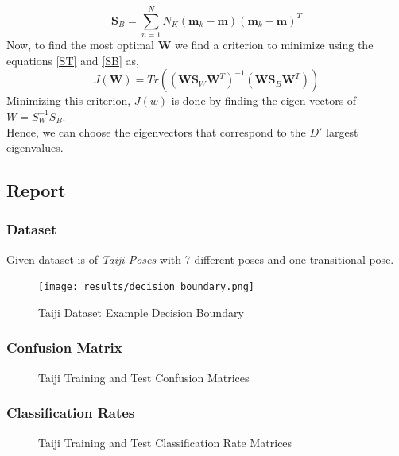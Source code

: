 \documentclass[12pt,twoside,a4paper]{article}
\begin{document}
\begin{equation} \label{SB}
    \textbf{S}_B = \sum_{n=1}^N N_K(\textbf{m}_k - \textbf{m})(\textbf{m}_k - \textbf{m})^T
\end{equation}
Now, to find the most optimal \textbf{W} we find a criterion to minimize using the equations \eqref{ST} and \eqref{SB} as,
\begin{equation}
    J(\textbf{W}) = Tr\left( (\textbf{W}\textbf{S}_W\textbf{W}^T)^{-1} (\textbf{W}\textbf{S}_B\textbf{W}^T) \right )
\end{equation}
Minimizing this criterion, $J(w)$ is done by finding the eigen-vectors of $W = S_W^{-1}S_B$. \\
Hence, we can choose the eigenvectors that correspond to the $D'$ largest eigenvalues.

\pagebreak
\subsection{Report}
\subsubsection{Dataset}
Given dataset is of \textit{Taiji Poses} with 7 different poses and one transitional pose.
\begin{figure}[H]
    \centering
    \texttt{[image: results/decision\_boundary.png]}
    \caption{Taiji Dataset Example Decision Boundary}
    \label{fig:my_label}
\end{figure}
\subsubsection{Confusion Matrix}
\begin{figure}[H]
    \centering
    \hspace{0mm}
    \hspace{0mm}
    \caption{Taiji Training and Test Confusion Matrices}
\end{figure}
\subsubsection{Classification Rates}
\begin{figure}[H]
    \centering
    \hspace{0mm}
    \hspace{0mm}
    \caption{Taiji Training and Test Classification Rate Matrices}
\end{figure}
\end{document}
